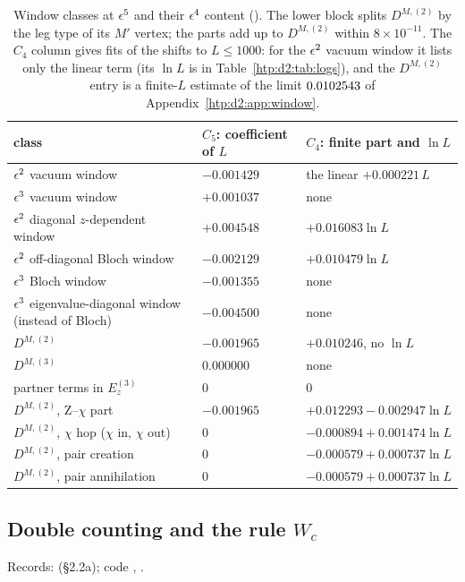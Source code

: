 \begin{table}[ht]
\centering\footnotesize\renewcommand{\arraystretch}{1.15}
\begin{tabular}{@{}p{7.4cm}p{3.2cm}p{4.4cm}@{}}
\toprule
class & $C_5$: coefficient of $L$ & $C_4$: finite part and $\ln L$ \\\midrule
$\epsilon^2$ vacuum window & $-0.001429$ & the linear $+0.000221\,L$ \\
$\epsilon^3$ vacuum window & $+0.001037$ & none \\
$\epsilon^2$ diagonal $z$-dependent window & $+0.004548$ & $+0.016083\ln L$ \\
$\epsilon^2$ off-diagonal Bloch window & $-0.002129$ & $+0.010479\ln L$ \\
$\epsilon^3$ Bloch window & $-0.001355$ & none \\
$\epsilon^3$ eigenvalue-diagonal window (instead of Bloch) & $-0.004500$ & none \\
$D^{M,(2)}$ & $-0.001965$ & $+0.010246$, no $\ln L$ \\
$D^{M,(3)}$ & $0.000000$ & none \\
partner terms in $E_z^{(3)}$ & 0 & 0 \\\midrule
$D^{M,(2)}$, Z--$\chi$ part & $-0.001965$ & $+0.012293-0.002947\ln L$ \\
$D^{M,(2)}$, $\chi$ hop ($\chi$ in, $\chi$ out) & 0 & $-0.000894+0.001474\ln L$ \\
$D^{M,(2)}$, pair creation & 0 & $-0.000579+0.000737\ln L$ \\
$D^{M,(2)}$, pair annihilation & 0 & $-0.000579+0.000737\ln L$ \\
\bottomrule
\end{tabular}
\caption{Window classes at $\epsilon^5$ and their $\epsilon^4$ content (). The lower
block splits $D^{M,(2)}$ by the leg type of its $M'$ vertex; the parts add up to $D^{M,(2)}$ within $8\times10^{-11}$. The $C_4$
column gives fits of the shifts to $L\le1000$: for the $\epsilon^2$ vacuum window it lists only the linear term (its $\ln L$ is in
Table~\ref{htp:d2:tab:logs}), and the $D^{M,(2)}$ entry is a finite-$L$ estimate of the limit $0.0102543$ of
Appendix~\ref{htp:d2:app:window}.}
\label{htp:d2:tab:c5classes}
\end{table}

\subsection{Double counting and the rule \texorpdfstring{$W_c$}{Wc}}\label{htp:d2:app:Wc}
{\small\raggedright\noindent Records:  (\S2.2a); code ,
.\par}

